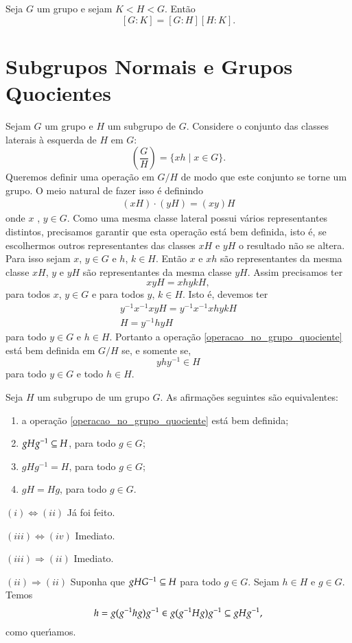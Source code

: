 \begin{proposicao}
	Seja $G$ um grupo e sejam $K < H < G$. Ent\~ao
	\[
		[G:K] = [G:H][H:K].
	\]
\end{proposicao}

\section{Subgrupos Normais e Grupos Quocientes} %
\label{sec:subgrupos_normais_e_grupos_quocientes}

Sejam $G$ um grupo e $H$ um subgrupo de $G$. Considere o conjunto das classes laterais \`a esquerda de $H$ em $G$:
\[
	\left(\dfrac{G}{H}\right) = \{xh \mid x \in G\}.
\]
Queremos definir uma opera\c{c}\~ao em $G/H$ de modo que este conjunto se torne um grupo. O meio natural de fazer isso \'e definindo
\begin{align}\label{operacao_no_grupo_quociente}
	(xH)\cdot (yH) = (xy)H
\end{align}
onde $x$ , $y \in G$. Como uma mesma classe lateral possui v\'arios representantes distintos, precisamos garantir que esta opera\c{c}\~ao est\'a bem definida, isto \'e, se escolhermos outros representantes das classes $xH$ e $yH$ o resultado n\~ao se altera. Para isso sejam $x$, $y \in G$ e $h$, $k \in H$. Ent\~ao $x$ e $xh$ s\~ao representantes da mesma classe $xH$, $y$ e $yH$ s\~ao representantes da mesma classe $yH$. Assim precisamos ter
\[
	xyH = xhykH,
\]
para todos $x$, $y \in G$ e para todos $y$, $k \in H$. Isto \'e, devemos ter
\begin{align*}
	y^{-1}x^{-1}xyH = y^{-1}x^{-1}xhykH\\
	H = y^{-1}hyH
\end{align*}
para todo $y \in G$ e $h \in H$. Portanto a opera\c{c}\~ao \eqref{operacao_no_grupo_quociente} est\'a bem definida em $G/H$ se, e somente se,
\[
	yhy^{-1} \in H
\]
para todo $y \in G$ e todo $h \in H$.

\begin{proposicao}\label{condicoes_subgrupo_normal}
	Seja $H$ um subgrupo de um grupo $G$. As afirma\c{c}\~oes seguintes s\~ao equivalentes:
	\begin{enumerate}[label=({\roman*})]
		\item a opera\c{c}\~ao \eqref{operacao_no_grupo_quociente} est\'a bem definida;
		\item $gHg^{-1} \subseteq H$, para todo $g \in G$;
		\item $gHg^{-1} = H$, para todo $g \in G$;
		\item $gH = Hg$, para todo $g \in G$.
	\end{enumerate}
\end{proposicao}
\begin{prova}
	$(i) \Leftrightarrow (ii)$ J\'a foi feito.

	$(iii) \Leftrightarrow (iv)$ Imediato.

	$(iii) \Rightarrow (ii)$ Imediato.

	$(ii) \Rightarrow (ii)$ Suponha que $gHG^{-1} \subseteq H$ para todo $g \in G$. Sejam $h \in H$ e $g \in G$. Temos
	\[
		h = g(g^{-1}hg)g^{-1} \in g(g^{-1}Hg)g^{-1} \subseteq gHg^{-1},
	\]
	como quer{\'\i}amos.
\end{prova}

